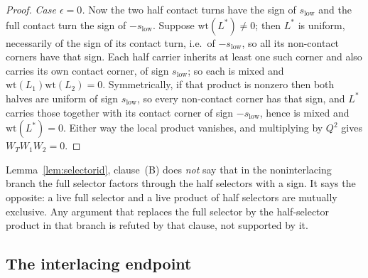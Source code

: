 \begin{proof}
\emph{Case $\epsilon=0$.} Now the two half contact turns have the sign of
$s_{\mathrm{low}}$ and the full contact turn the sign of $-s_{\mathrm{low}}$.
Suppose $\mathrm{wt}(L^{*})\neq0$; then $L^{*}$ is uniform, necessarily of the
sign of its contact turn, i.e.\ of $-s_{\mathrm{low}}$, so all its non-contact
corners have that sign. Each half carrier inherits at least one such corner and
also carries its own contact corner, of sign $s_{\mathrm{low}}$; so each is
mixed and $\mathrm{wt}(L_1)\mathrm{wt}(L_2)=0$. Symmetrically, if that product
is nonzero then both halves are uniform of sign $s_{\mathrm{low}}$, so every
non-contact corner has that sign, and $L^{*}$ carries those together with its
contact corner of sign $-s_{\mathrm{low}}$, hence is mixed and
$\mathrm{wt}(L^{*})=0$. Either way the local product vanishes, and multiplying
by $Q^2$ gives $W_TW_1W_2=0$.
\end{proof}

\begin{remark}\label{rem:noscalarfact}
Lemma~\ref{lem:selectorid}, clause~(B) does \emph{not} say that in the noninterlacing
branch the full selector factors through the half selectors with a sign. It
says the opposite: a live full selector and a live product of half selectors
are mutually exclusive. Any argument that replaces the full selector by the
half-selector product in that branch is refuted by that clause, not supported by
it.
\end{remark}

\subsection{The interlacing endpoint}\label{sec:sr12}

